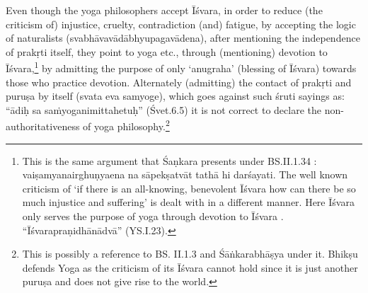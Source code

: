 Even though the yoga philosophers accept Īśvara, in order to reduce (the criticism of) injustice, cruelty, contradiction (and) fatigue, by accepting the logic of naturalists (svabhāvavādābhyupagavādena), after mentioning the independence of prakṛti itself, they point to yoga etc., through (mentioning) devotion to Īśvara,\footnote{This is the same argument that Śaṇkara presents under BS.II.1.34 : vaiṣamyanairghuṇyaena na sāpekṣatvāt tathā hi darśayati. The well known criticism of ‘if there is an all-knowing, benevolent Īśvara how can there be so much injustice and suffering’ is dealt with in a different manner. Here Īśvara only serves the purpose of yoga through devotion to Īśvara . “Īśvarapraṇidhānādvā” (YS.I.23).} by admitting the purpose of only ‘anugraha’ (blessing of Īśvara) towards those who practice devotion. Alternately (admitting) the contact of prakṛti and puruṣa by itself (svata eva samyoge), which goes against such śruti sayings as: “ādiḥ sa saṁyoganimittahetuḥ” (Śvet.6.5) it is not correct to declare the non-authoritativeness of yoga philosophy.\footnote{This is possibly a reference to BS. II.1.3 and Śāṅkarabhāṣya under it. Bhikṣu defends Yoga as the criticism of its Īśvara cannot hold since it is just another puruṣa and does not give rise to the world.} 

